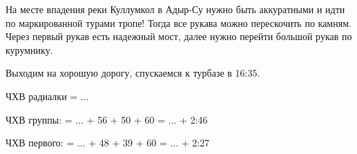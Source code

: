 На месте впадения реки Куллумкол в Адыр-Су нужно быть аккуратными и идти по маркированной турами тропе! Тогда все рукава можно перескочить по камням.
Через первый рукав есть надежный мост, далее нужно перейти большой рукав по курумнику.

Выходим на хорошую дорогу, спускаемся к турбазе в 16:35.







ЧХВ радиалки = ...

ЧХВ группы:  = ... + 56 + 50 + 60 = ... + 2:46

ЧХВ первого:  = ... + 48 + 39 + 60 = ... + 2:27

    \FloatBarrier
